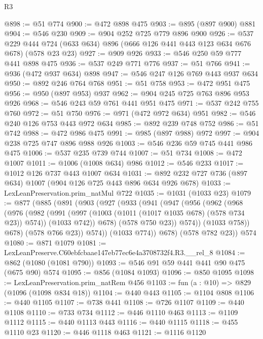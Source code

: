 \begin{lexlean}{R3}
\begin{coremodule}
@898 := @51 @774
@900 := @472 @898 @475
@903 := @895 (@897 @900) @881
@904 := @546 @230
@909 := @904 @252 @725 @779 @896 @900
@926 := @537
    @229
    @444
    @724
    (@633 @634)
    @896
    (@666 @126 @441 @443 @123 @634 @676 @678)
    (@578 @23 @23)
@927 := @909 @926
@933 := @546 @250 @59 @777 @441 @898 @475
@936 := @537 @249 @771 @776
@937 := @51 @766
@941 := @936 (@472 @937 @634) @898
@947 := @546 @247 @126 @769 @443 @937 @634
@950 := @892 @246 @764 @768
@951 := @51 @758
@953 := @472 @951 @475
@956 := @950 (@897 @953) @937
@962 := @904 @245 @725 @763 @896 @953 @926
@968 := @546 @243 @59 @761 @441 @951 @475
@971 := @537 @242 @755 @760
@972 := @51 @750
@976 := @971 (@472 @972 @634) @951
@982 := @546 @240 @126 @753 @443 @972 @634
@985 := @892 @239 @748 @752
@986 := @51 @742
@988 := @472 @986 @475
@991 := @985 (@897 @988) @972
@997 := @904 @238 @725 @747 @896 @988 @926
@1003 := @546 @236 @59 @745 @441 @986 @475
@1006 := @537 @235 @739 @744
@1007 := @51 @734
@1008 := @472 @1007
@1011 := @1006 (@1008 @634) @986
@1012 := @546 @233
@1017 := @1012 @126 @737 @443 @1007 @634
@1031 := @892 @232 @727 @736 (@897 @634) @1007 (@904 @126 @725 @443 @896 @634 @926 @678)
@1033 := LexLeanPreservation.prim_natMul @722
@1035 := @1031 (@1033 @23)
@1079 := @877
    (@885
      (@891
        (@903
          (@927
            (@933
              (@941
                (@947
                  (@956
                    (@962
                      (@968
                        (@976
                          (@982
                            (@991
                              (@997 (@1003 (@1011 (@1017 @1035 @678) (@578 @734 @23)) @574))
                              (@1033 @742))
                            @678)
                          (@578 @750 @23))
                        @574))
                    (@1033 @758))
                  @678)
                (@578 @766 @23))
              @574))
          (@1033 @774))
        @678)
      (@578 @782 @23))
    @574
@1080 := @871 @1079
@1081 := LexLeanPreserve.C60ebfcbaae147eb77ec6e4a3708732f4.R3.__rel_8
@1084 := @862 (@1080 (@1081 @790))
@1093 := @546 @91 @59 @441 @441 @90 @475 (@675 @90) @574
@1095 := @856 (@1084 @1093)
@1096 := @850 @1095
@1098 := LexLeanPreservation.prim_natRem @456
@1103 := fun (a : @10) => @829 (@1096 (@1098 @834 @18))
@1104 := @440 @443
@1105 := @1104 @808
@1106 := @440 @1105
@1107 := @738 @441
@1108 := @726 @1107
@1109 := @440 @1108
@1110 := @733 @734
@1112 := @446 @1110 @463
@1113 := @1109 @1112
@1115 := @440 @1113 @443
@1116 := @440 @1115
@1118 := @455 @1110 @23
@1120 := @446 @1118 @463
@1121 := @1116 @1120

\end{coremodule}
\end{lexlean}
